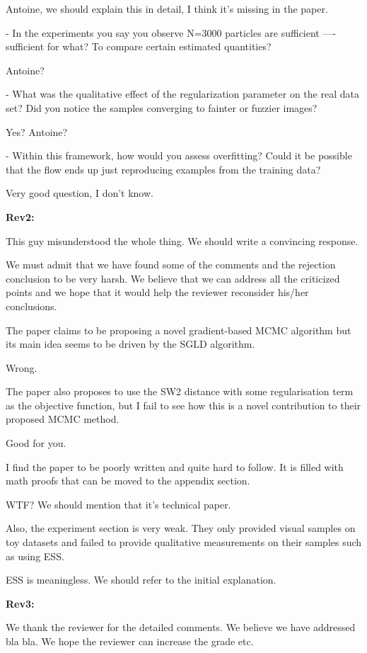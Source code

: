 \documentclass{article}
\newcommand{\rev}[1]{{\color{red} #1}}
\newcommand{\umut}[1]{{\color{blue} #1}}
\begin{document}
\umut{Antoine, we should explain this in detail, I think it's missing in the paper.}

\rev{- In the experiments you say you observe N=3000 particles are sufficient —- sufficient for what? To compare certain estimated quantities?}

\umut{Antoine?}

\rev{- What was the qualitative effect of the regularization parameter on the real data set? Did you notice the samples converging to fainter or fuzzier images?}

\umut{Yes? Antoine?}

\rev{- Within this framework, how would you assess overfitting? Could it be possible that the flow ends up just reproducing examples from the training data?}

\umut{Very good question, I don't know.}

\textbf{Rev2:}

\umut{This guy misunderstood the whole thing. We should write a convincing response.}

\umut{We must admit that we have found some of the comments and the rejection conclusion to be very harsh. We believe that we can address all the criticized points and we hope that it would help the reviewer reconsider his/her conclusions.
}

\rev{The paper claims to be proposing a novel gradient-based MCMC algorithm but its main idea seems to be driven by the SGLD algorithm.} 

\umut{Wrong.}

\rev{The paper also proposes to use the SW2 distance with some regularisation term as the objective function, but I fail to see how this is a novel contribution to their proposed MCMC method.}

\umut{Good for you.}

\rev{I find the paper to be poorly written and quite hard to follow. It is filled with math proofs that can be moved to the appendix section.}

\umut{WTF? We should mention that it's technical paper.}

\rev{Also, the experiment section is very weak. They only provided visual samples on toy datasets and failed to provide qualitative measurements on their samples such as using ESS.}

\umut{ESS is meaningless. We should refer to the initial explanation.}


\textbf{Rev3:}


\umut{We thank the reviewer for the detailed comments. We believe we have addressed bla bla. We hope the reviewer can increase the grade etc. }
\end{document}
